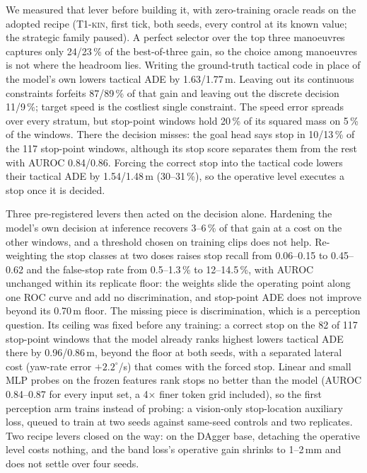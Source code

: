 \documentclass[10pt,twocolumn]{article}
\makeatletter
\theoremstyle{remark}
\newcommand{\tier}[1]{\textsc{\small #1}}
\renewcommand\paragraph{\@startsection{paragraph}{4}{\z@}{1.6ex \@plus .5ex \@minus .2ex}{-1em}{\normalfont\normalsize\bfseries}}
\makeatother
\begin{document}
\paragraph{Where the tactical headroom sits.} We measured that lever before building it, with zero-training oracle reads on the adopted recipe (\tier{T1-kin}, first tick, both seeds, every control at its known value; the strategic family paused). A perfect selector over the top three manoeuvres captures only 24/23\,\% of the best-of-three gain, so the choice among manoeuvres is not where the headroom lies. Writing the ground-truth tactical code in place of the model's own lowers tactical ADE by 1.63/1.77\,m. Leaving out its continuous constraints forfeits 87/89\,\% of that gain and leaving out the discrete decision 11/9\,\%; target speed is the costliest single constraint. The speed error spreads over every stratum, but stop-point windows hold 20\,\% of its squared mass on 5\,\% of the windows. There the decision misses: the goal head says stop in 10/13\,\% of the 117 stop-point windows, although its stop score separates them from the rest with AUROC 0.84/0.86. Forcing the correct stop into the tactical code lowers their tactical ADE by 1.54/1.48\,m (30--31\,\%), so the operative level executes a stop once it is decided.

Three pre-registered levers then acted on the decision alone. Hardening the model's own decision at inference recovers 3--6\,\% of that gain at a cost on the other windows, and a threshold chosen on training clips does not help. Re-weighting the stop classes at two doses raises stop recall from 0.06--0.15 to 0.45--0.62 and the false-stop rate from 0.5--1.3\,\% to 12--14.5\,\%, with AUROC unchanged within its replicate floor: the weights slide the operating point along one ROC curve and add no discrimination, and stop-point ADE does not improve beyond its 0.70\,m floor. The missing piece is discrimination, which is a perception question. Its ceiling was fixed before any training: a correct stop on the 82 of 117 stop-point windows that the model already ranks highest lowers tactical ADE there by 0.96/0.86\,m, beyond the floor at both seeds, with a separated lateral cost (yaw-rate error $+2.2^{\circ}$/s) that comes with the forced stop. Linear and small MLP probes on the frozen features rank stops no better than the model (AUROC 0.84--0.87 for every input set, a 4$\times$ finer token grid included), so the first perception arm trains instead of probing: a vision-only stop-location auxiliary loss, queued to train at two seeds against same-seed controls and two replicates. Two recipe levers closed on the way: on the DAgger base, detaching the operative level costs nothing, and the band loss's operative gain shrinks to 1--2\,mm and does not settle over four seeds.
\end{document}
